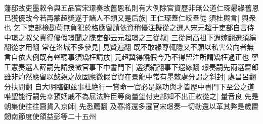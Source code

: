藩邸故吏墨敕令與五品官宋璟奏故舊恩私則有大例除官資歷非無公道仁琛曏緣舊恩已獲優改今若再蒙超奬遂于諸人不類又是后族|{
	王仁琛蓋仁皎羣從}
須杜輿言|{
	輿衆也}
乞下吏部檢勘苟無負犯於格應留請依資稍優注擬從之選人宋元超于吏部自言侍中璟之叔父冀得優假璟聞之牒吏部云元超璟之三從叔|{
	三從同高祖下遐嫁翻選須絹翻從才用翻}
常在洛城不多參見|{
	見賢遍翻}
既不敢緣尊輒隱又不願以私害公向者無言自依大例既有聲聽事須矯枉請放|{
	元超冀得饒假今乃不得留注所謂矯枉過正也}
寧王憲奏選人薛嗣先請授微官事下中書門下|{
	選須絹翻事下遐嫁翻}
璟奏嗣先兩選齋郎雖非灼然應留以懿親之故固應微假官資在景龍中常有墨敕處分謂之斜封|{
	處昌呂翻分扶問翻}
自大明臨御兹事杜絶行一賞命一官必是緣功與才皆歷中書門下至公之道唯聖能行嗣先幸預姻戚不為屈法許臣等商量望付吏部知不出正敕從之|{
	量音良}
先是朝集使往往齎貨入京師|{
	先悉薦翻}
及春將還多遷官宋璟奏一切勒還以革其弊是歲置劒南節度使領益彭等二十五州

